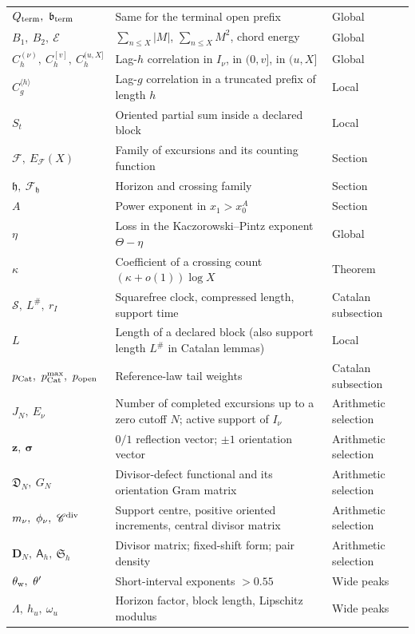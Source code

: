 \documentclass[11pt,reqno]{amsart}
\makeatletter
\let\CG@origref\ref
\newcommand{\CG@gettip}[1]{\@ifundefined{CGTip@#1}{Reference: #1}{\csname CGTip@#1\endcsname}}
\DeclareRobustCommand{\CGref}[1]{\pdftooltip{\CG@origref{#1}}{\CG@gettip{#1}}}
\numberwithin{equation}{section}
\theoremstyle{plain}
\theoremstyle{definition}
\theoremstyle{remark}
\newcommand{\Sq}{\mathcal{S}}
\newcommand{\En}{\mathcal{E}}
\newcommand{\F}{\mathcal{F}}
\makeatother
\begin{document}
\begin{longtable}{@{}p{}p{}p{}@{}}
$Q_{\rm term},\ \mathfrak b_{\rm term}$ & Same for the terminal open prefix & Global\\
$B_1,\ B_2,\ \En$ & $\sum_{n\le X}|M|$, $\sum_{n\le X}M^2$, chord energy & Global\\
$C_h^{(\nu)},\ C_h^{[v]},\ C_h^{(u,X]}$ & Lag-$h$ correlation in $I_\nu$, in $(0,v]$, in $(u,X]$ & Global\\
$C_g^{\langle h\rangle}$ & Lag-$g$ correlation in a truncated prefix of length $h$ & Local\\
$S_t$ & Oriented partial sum inside a declared block & Local\\
$\F,\ E_\F(X)$ & Family of excursions and its counting function & Section~\CGref{sec:lacunary}\\
$\mathfrak h,\ \F_{\mathfrak h}$ & Horizon and crossing family & Section~\CGref{sec:lacunary}\\
$A$ & Power exponent in $x_1>x_0^A$ & Section~\CGref{sec:lacunary}\\
$\eta$ & Loss in the Kaczorowski--Pintz exponent $\Theta-\eta$ & Global\\
$\kappa$ & Coefficient of a crossing count $(\kappa+o(1))\log X$ & Theorem~\CGref{thm:horizon}\\
$\Sq,\ L^\#,\ r_I$ & Squarefree clock, compressed length, support time & Catalan subsection\\
$L$ & Length of a declared block (also support length $L^\#$ in Catalan lemmas) & Local\\
$p_{\rm Cat},\ p^{\max}_{\rm Cat},\ p_{\rm open}$ & Reference-law tail weights & Catalan subsection\\
$J_N,\ E_\nu$ & Number of completed excursions up to a zero cutoff $N$; active support of $I_\nu$ & Arithmetic selection\\
$\mathbf z,\ \boldsymbol\sigma$ & $0/1$ reflection vector; $\pm1$ orientation vector & Arithmetic selection\\
$\mathfrak D_N,\ G_N$ & Divisor-defect functional and its orientation Gram matrix & Arithmetic selection\\
$m_\nu,\ \phi_\nu,\ \mathscr C^{\rm div}$ & Support centre, positive oriented increments, central divisor matrix & Arithmetic selection\\
$\mathbf D_N,\ \mathsf A_h,\ \mathfrak S_h$ & Divisor matrix; fixed-shift form; pair density & Arithmetic selection\\
$\theta_{\rm w},\ \theta'$ & Short-interval exponents $>0.55$ & Wide peaks\\
$\Lambda,\ h_u,\ \omega_u$ & Horizon factor, block length, Lipschitz modulus & Wide peaks\\

\end{longtable}
\end{document}
